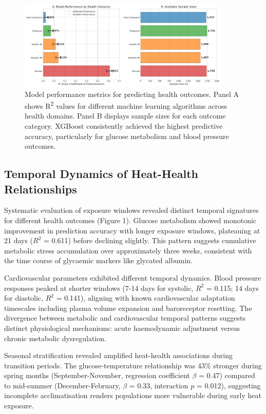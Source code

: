\documentclass[11pt,a4paper]{article}
\begin{document}
\begin{figure}[H]
\centering
\includegraphics[width=0.9\textwidth]{heat_analysis_optimized/analysis/Figure1_ModelPerformance.png}
\caption{Model performance metrics for predicting health outcomes. Panel A shows R\textsuperscript{2} values for different machine learning algorithms across health domains. Panel B displays sample sizes for each outcome category. XGBoost consistently achieved the highest predictive accuracy, particularly for glucose metabolism and blood pressure outcomes.}
\label{fig:model_performance}
\end{figure}

\subsection{Temporal Dynamics of Heat-Health Relationships}

Systematic evaluation of exposure windows revealed distinct temporal signatures for different health outcomes (Figure 1). Glucose metabolism showed monotonic improvement in prediction accuracy with longer exposure windows, plateauing at 21 days ($R^2$ = 0.611) before declining slightly. This pattern suggests cumulative metabolic stress accumulation over approximately three weeks, consistent with the time course of glycaemic markers like glycated albumin.

Cardiovascular parameters exhibited different temporal dynamics. Blood pressure responses peaked at shorter windows (7-14 days for systolic, $R^2$ = 0.115; 14 days for diastolic, $R^2$ = 0.141), aligning with known cardiovascular adaptation timescales including plasma volume expansion and baroreceptor resetting. The divergence between metabolic and cardiovascular temporal patterns suggests distinct physiological mechanisms: acute haemodynamic adjustment versus chronic metabolic dysregulation.

Seasonal stratification revealed amplified heat-health associations during transition periods. The glucose-temperature relationship was 43\% stronger during spring months (September-November, regression coefficient $\beta$ = 0.47) compared to mid-summer (December-February, $\beta$ = 0.33, interaction $p$ = 0.012), suggesting incomplete acclimatisation renders populations more vulnerable during early heat exposure.
\end{document}
